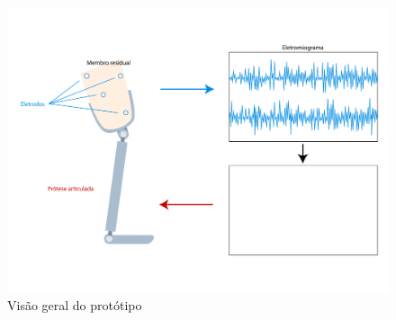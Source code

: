 \begin{figure}[h]
	\caption{\label{fig:bigpicture}Visão geral do protótipo}
	\begin{center}
	    \includegraphics[width=1\textwidth]{resources/big_picture}
	\end{center}
\end{figure}